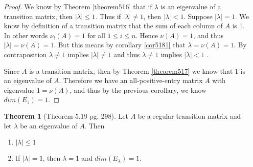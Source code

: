 \documentclass{amsart}
\theoremstyle{definition}
\newtheorem{theorem}{Theorem}
\theoremstyle{remark}
\numberwithin{equation}{section}
\begin{document}
\begin{proof}
    We know by Theorem \ref{theorem516} that if $\lambda$ is an eigenvalue of a transition matrix, then $|\lambda| \leq 1$.
    Thus if $|\lambda| \neq 1$, then $|\lambda| < 1$.
    Suppose $|\lambda| = 1$.
    We know by definition of a transition matrix that the sum of each column of $A$ is 1. In other words $\nu_i(A)=
    1$ for all $1 \leq i \leq n$. Hence $\nu(A) = 1$, and thus $|\lambda| = \nu(A) = 1$.
    But this means by corollary \ref{cor5181} that $\lambda = \nu(A) = 1$.
    By contraposition $\lambda \neq 1$ implies $|\lambda| \neq  1$ and thus $\lambda \neq 1$ implies $|\lambda| <  1$ .

    Since $A$ is a transition matrix, then by Theorem \ref{theorem517} we know that $1$ is an
    eigenvalue of $A$. Therefore we have an all-positive-entry matrix $A$ with eigenvalue $1 =
    \nu(A)$, and thus by the previous corollary, we know $dim(E_1) =
    1$.




\end{proof}

\begin{theorem}[Theorem 5.19 pg. 298]\label{theorem519}
Let $A$ be a regular transition matrix and let $\lambda$ be an eigenvalue of $A$.  Then

\begin{enumerate}
    \item $|\lambda| \leq 1$
    \item If $|\lambda| = 1$, then $\lambda = 1$ and $dim(E_{\lambda}) = 1$.

\end{enumerate}

\end{theorem}
\end{document}
